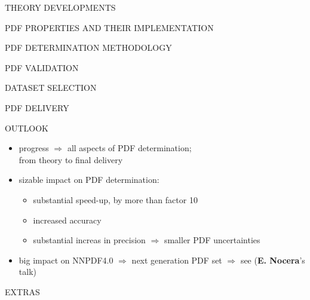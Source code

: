 \documentclass[a4,landscape]{seminar}
\newcommand{\1}{1\!\!\!1}
\begin{document}
\begin{slide}\begin{center}
  \huge\blue THEORY DEVELOPMENTS
\end{center}\end{slide}
\begin{slide}\begin{center}
  \huge\blue PDF PROPERTIES AND THEIR IMPLEMENTATION
\end{center}\end{slide}
\begin{slide}\begin{center}
  \huge\blue PDF DETERMINATION METHODOLOGY
\end{center}\end{slide}
\begin{slide}\begin{center}
  \huge\blue PDF VALIDATION
\end{center}\end{slide}
\begin{slide}\begin{center}
  \huge\blue DATASET SELECTION
\end{center}\end{slide}
\begin{slide}\begin{center}
  \huge\blue PDF DELIVERY
\end{center}\end{slide}\renewcommand{\slidestretch}{1.3}
\begin{slide}
\begin{center}{\Large\blue OUTLOOK}\\
{\large \begin{itemize}
\item {\darkgreen progress} $\Rightarrow$  {\red all aspects} of PDF
determination;\\\qquad from {\magenta theory} to {\magenta final delivery}
\item sizable {\darkgreen impact} on PDF determination:\begin{itemize}
\item substantial {\red speed-up}, by more than factor 10
\item increased {\red accuracy}
  \item substantial increas in {\red precision} $\Rightarrow$
    {\magenta smaller PDF
    uncertainties}
    \end{itemize}
\item big {\blue impact on NNPDF4.0} $\Rightarrow$ {\orange next generation PDF} set
$\Rightarrow$ see   ({\rm{\bf E. Nocera}'s
  talk})
  \end{itemize}}
\end{center}
\end{slide}
\begin{slide}\begin{center}
  \huge\blue EXTRAS
\end{center}\end{slide}
\end{document}
